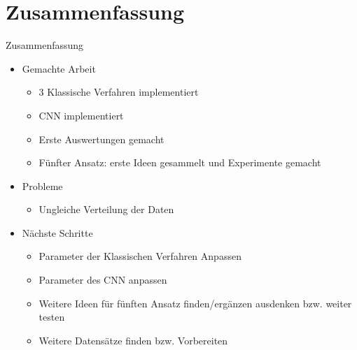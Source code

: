 \documentclass[aspectratio=169]{beamer} %
\begin{document}
\section{Zusammenfassung}
\begin{frame}
    \begin{block}{Zusammenfassung}
        \begin{itemize}
            \item Gemachte Arbeit
                  \begin{itemize}
                      \item 3 Klassische Verfahren implementiert
                      \item CNN implementiert
                      \item Erste Auswertungen gemacht
                      \item F\"unfter Ansatz: erste Ideen gesammelt und Experimente gemacht
                  \end{itemize}
            \item Probleme
                  \begin{itemize}
                      \item Ungleiche Verteilung der Daten
                  \end{itemize}
            \item N\"achste Schritte
                  \begin{itemize}
                      \item Parameter der Klassischen Verfahren Anpassen
                      \item Parameter des CNN anpassen
                      \item Weitere Ideen f\"ur f\"unften Ansatz finden/erg\"anzen
                            ausdenken bzw. weiter testen
                      \item Weitere Datens\"atze finden bzw. Vorbereiten
                  \end{itemize}
        \end{itemize}
    \end{block}
\end{frame}
\end{document}
